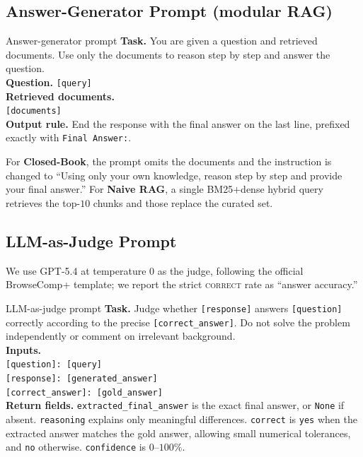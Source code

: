 \documentclass{article}
\begin{document}
\subsection{Answer-Generator Prompt (modular RAG)}
\label{app:ansgen-prompt}

\begin{promptbox}{Answer-generator prompt}
\textbf{Task.} You are given a question and retrieved documents. Use
only the documents to reason step by step and answer the question.\\[3pt]
\textbf{Question.} \texttt{[query]}\\[3pt]
\textbf{Retrieved documents.}\\
\texttt{[documents]}\\[3pt]
\textbf{Output rule.} End the response with the final answer on the
last line, prefixed exactly with \texttt{Final Answer:}.
\end{promptbox}
For \textbf{Closed-Book}, the prompt omits the documents and the
instruction is changed to ``Using only your own knowledge, reason
step by step and provide your final answer.'' For
\textbf{Naive RAG}, a single BM25$+$dense hybrid query retrieves
the top-$10$ chunks and those replace the curated set.

\subsection{LLM-as-Judge Prompt}
\label{app:judge-prompt}

We use GPT-5.4 at temperature $0$ as the judge, following the
official BrowseComp+ template; we report the strict
\textsc{correct} rate as ``answer accuracy.''
\begin{promptbox}{LLM-as-judge prompt}
\textbf{Task.} Judge whether \texttt{[response]} answers
\texttt{[question]} correctly according to the precise
\texttt{[correct\_answer]}. Do not solve the problem independently or
comment on irrelevant background.\\[3pt]
\textbf{Inputs.}\\
\texttt{[question]: [query]}\\
\texttt{[response]: [generated\_answer]}\\
\texttt{[correct\_answer]: [gold\_answer]}\\[3pt]
\textbf{Return fields.}
\texttt{extracted\_final\_answer} is the exact final answer, or
\texttt{None} if absent. \texttt{reasoning} explains only meaningful
differences. \texttt{correct} is \texttt{yes} when the extracted
answer matches the gold answer, allowing small numerical tolerances,
and \texttt{no} otherwise. \texttt{confidence} is $0$--$100\%$.
\end{promptbox}
\end{document}
